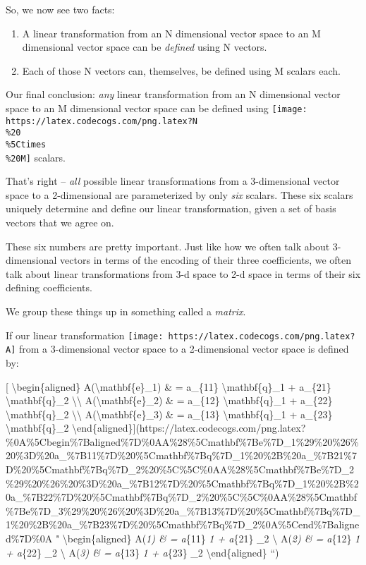 \documentclass[]{article}
\begin{document}
So, we now see two facts:

\begin{enumerate}
\def\labelenumi{\arabic{enumi}.}
\tightlist
\item
  A linear transformation from an N dimensional vector space to an M dimensional
  vector space can be \emph{defined} using N vectors.
\item
  Each of those N vectors can, themselves, be defined using M scalars each.
\end{enumerate}

Our final conclusion: \emph{any} linear transformation from an N dimensional
vector space to an M dimensional vector space can be defined using
\texttt{[image: https://latex.codecogs.com/png.latex?N\\\%20\\\%5Ctimes\\\%20M]}
scalars.

That's right -- \emph{all} possible linear transformations from a 3-dimensional
vector space to a 2-dimensional are parameterized by only \emph{six} scalars.
These six scalars uniquely determine and define our linear transformation, given
a set of basis vectors that we agree on.

These six numbers are pretty important. Just like how we often talk about
3-dimensional vectors in terms of the encoding of their three coefficients, we
often talk about linear transformations from 3-d space to 2-d space in terms of
their six defining coefficients.

We group these things up in something called a \emph{matrix}.

If our linear transformation
\texttt{[image: https://latex.codecogs.com/png.latex?A]} from a 3-dimensional
vector space to a 2-dimensional vector space is defined by:

{[} \textbackslash{}begin\{aligned\} A(\textbackslash{}mathbf\{e\}\_1) \& =
a\_\{11\} \textbackslash{}mathbf\{q\}\_1 + a\_\{21\}
\textbackslash{}mathbf\{q\}\_2 \textbackslash{}\textbackslash{}
A(\textbackslash{}mathbf\{e\}\_2) \& = a\_\{12\} \textbackslash{}mathbf\{q\}\_1
+ a\_\{22\} \textbackslash{}mathbf\{q\}\_2 \textbackslash{}\textbackslash{}
A(\textbackslash{}mathbf\{e\}\_3) \& = a\_\{13\} \textbackslash{}mathbf\{q\}\_1
+ a\_\{23\} \textbackslash{}mathbf\{q\}\_2
\textbackslash{}end\{aligned\}{]}(https://latex.codecogs.com/png.latex?\%0A\%5Cbegin\%7Baligned\%7D\%0AA\%28\%5Cmathbf\%7Be\%7D\_1\%29\%20\%26\%20\%3D\%20a\_\%7B11\%7D\%20\%5Cmathbf\%7Bq\%7D\_1\%20\%2B\%20a\_\%7B21\%7D\%20\%5Cmathbf\%7Bq\%7D\_2\%20\%5C\%5C\%0AA\%28\%5Cmathbf\%7Be\%7D\_2\%29\%20\%26\%20\%3D\%20a\_\%7B12\%7D\%20\%5Cmathbf\%7Bq\%7D\_1\%20\%2B\%20a\_\%7B22\%7D\%20\%5Cmathbf\%7Bq\%7D\_2\%20\%5C\%5C\%0AA\%28\%5Cmathbf\%7Be\%7D\_3\%29\%20\%26\%20\%3D\%20a\_\%7B13\%7D\%20\%5Cmathbf\%7Bq\%7D\_1\%20\%2B\%20a\_\%7B23\%7D\%20\%5Cmathbf\%7Bq\%7D\_2\%0A\%5Cend\%7Baligned\%7D\%0A
" \textbackslash{}begin\{aligned\} A(\emph{1) \& = a}\{11\}
\emph{1 + a}\{21\} \_2 \textbackslash{} A(\emph{2)
\& = a}\{12\} \emph{1 + a}\{22\} \_2 \textbackslash{}
A(\emph{3) \& = a}\{13\} \emph{1 + a}\{23\} \_2
\textbackslash{}end\{aligned\} ``)
\end{document}

